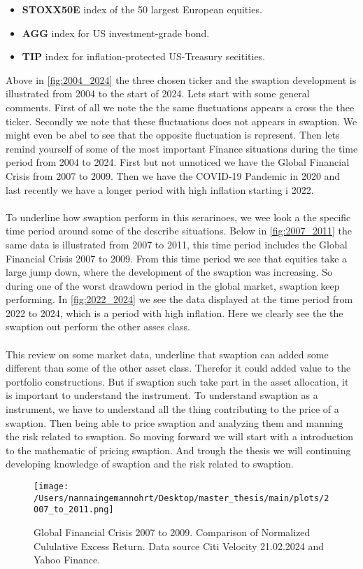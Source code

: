 \begin{itemize}
    \item \textbf{STOXX50E} \text{---}  index of the 50 largest European equities.
    \item \textbf{AGG} \text{---}  index for US investment-grade bond. 
    \item \textbf{TIP} \text{---}  index for inflation-protected US-Treasury secitities.
    \end{itemize}
\noindent
Above in \autoref{fig:2004_2024} the three chosen ticker and the swaption development
is illustrated from 2004 to the start of 2024. Lets start with some general comments.
First of all we note the the same fluctuations appears a cross the thee ticker. 
Secondly we note that these fluctuations does not appears in swaption. 
We might even be abel to see that the opposite fluctuation is represent. 
Then lets remind yourself of some of the most important Finance situations during 
the time period from 2004 to 2024. First but not unnoticed we have the Global Financial Crisis
from 2007 to 2009.  Then we have the COVID-19 Pandemic in 2020 and last recently we have a 
longer period with high inflation starting i 2022. 
\\\\
To underline how swaption perform in this serarinoes, we wee look a the specific time period
around some of the describe situations. Below in \autoref{fig:2007_2011} the same data is illustrated
from 2007 to 2011, this time period includes the Global Financial Crisis 2007 to 2009. 
From this time period we see that equities take a large jump down, where the development of the 
swaption was increasing. So during one of the worst drawdown period in the global market, 
swaption keep performing. In \autoref{fig:2022_2024} we see the data displayed at the 
time period from 2022 to 2024, which is a period with high inflation. 
Here we clearly see the the swaption out perform the other asses class. 
\\\\
This review on some market data, underline that swaption can added some different than some 
of the other asset class. Therefor it could added value to the portfolio constructions. 
But if swaption such take part in the asset allocation, it is important to understand the instrument.
To understand swaption as a instrument, we have to understand all the thing contributing to the price
of a swaption. Then being able to price swaption and analyzing them and manning the risk related to 
swaption.  So moving forward we will start with a introduction to the mathematic of pricing swaption. 
And trough the thesis we will continuing  developing knowledge of swaption and the risk related to swaption.
\begin{figure}[H]
    \centering
    \texttt{[image: /Users/nannaingemannohrt/Desktop/master\_thesis/main/plots/2007\_to\_2011.png]}
    \caption{Global Financial Crisis 2007 to 2009.  Comparison of Normalized Cululative Excess Return. Data source Citi Velocity 21.02.2024 
    and Yahoo Finance.}
    \label{fig:2007_2011}
\end{figure}
\noindent

